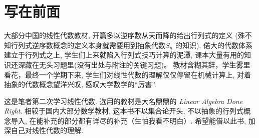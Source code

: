 \chapter*{写在前面}
大部分中国的线性代数教材, 开篇多以逆序数从天而降的给出行列式的定义
(殊不知行列式逆序数概念的定义本身就需要用到抽象代数\(S_{n}\) 的知识), 偌大的代数体系建立于行列式之上,
学生们上来就陷入行列式技巧计算的泥潭, 课本大量有用的知识还深藏在无头习题里(没有出处与附注的关键习题)。
教材含糊其辞，学生雾里看花，最终一个学期下来,
学生们对线性代数的理解仅仅停留在机械计算上, 对着抽象的代数概念望洋兴叹, 感叹大学数学的``厉害''.

这是笔者第二次学习线性代数. 选用的教材是大名鼎鼎的 \emph{Linear Algebra Done
Right}.
相较于国内大部分数学教材, 这本书不以集合论开头, 不以抽象的行列式概念导入,
在能补充的部分都有详尽的补充（生怕我看不明白）. 希望能借以此书, 加深自己对线性代数的理解.
